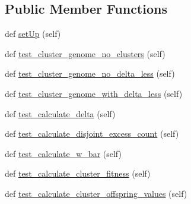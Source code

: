 \subsection*{Public Member Functions}
\begin{DoxyCompactItemize}
\item 
def \hyperlink{classNEAT__PyGenetics_1_1NEAT_1_1Tests_1_1GenomeClustererTests_1_1test__genomeClusterer_1_1TestGenomeClusterer_ad0bdd164ebb6347c8beb4ddf7742fb52}{set\+Up} (self)
\item 
def \hyperlink{classNEAT__PyGenetics_1_1NEAT_1_1Tests_1_1GenomeClustererTests_1_1test__genomeClusterer_1_1TestGenomeClusterer_a66e6a11e2e6d41bc5a8b276560029e96}{test\+\_\+cluster\+\_\+genome\+\_\+no\+\_\+clusters} (self)
\item 
def \hyperlink{classNEAT__PyGenetics_1_1NEAT_1_1Tests_1_1GenomeClustererTests_1_1test__genomeClusterer_1_1TestGenomeClusterer_ab619a0c345abbaf2ff03e990c514d193}{test\+\_\+cluster\+\_\+genome\+\_\+no\+\_\+delta\+\_\+less} (self)
\item 
def \hyperlink{classNEAT__PyGenetics_1_1NEAT_1_1Tests_1_1GenomeClustererTests_1_1test__genomeClusterer_1_1TestGenomeClusterer_a75b6137cf256927638ce38b23d0b8d0d}{test\+\_\+cluster\+\_\+genome\+\_\+with\+\_\+delta\+\_\+less} (self)
\item 
def \hyperlink{classNEAT__PyGenetics_1_1NEAT_1_1Tests_1_1GenomeClustererTests_1_1test__genomeClusterer_1_1TestGenomeClusterer_a677e1ee47c1688bfab9c2c183921aa1c}{test\+\_\+calculate\+\_\+delta} (self)
\item 
def \hyperlink{classNEAT__PyGenetics_1_1NEAT_1_1Tests_1_1GenomeClustererTests_1_1test__genomeClusterer_1_1TestGenomeClusterer_a31a46433f70bd1b7a4b3f480899c612f}{test\+\_\+calculate\+\_\+disjoint\+\_\+excess\+\_\+count} (self)
\item 
def \hyperlink{classNEAT__PyGenetics_1_1NEAT_1_1Tests_1_1GenomeClustererTests_1_1test__genomeClusterer_1_1TestGenomeClusterer_ac3c3bbcc8ab434021544730fdaff33fb}{test\+\_\+calculate\+\_\+w\+\_\+bar} (self)
\item 
def \hyperlink{classNEAT__PyGenetics_1_1NEAT_1_1Tests_1_1GenomeClustererTests_1_1test__genomeClusterer_1_1TestGenomeClusterer_a825bce2fcf584d1947fcfcb555357fb1}{test\+\_\+calculate\+\_\+cluster\+\_\+fitness} (self)
\item 
def \hyperlink{classNEAT__PyGenetics_1_1NEAT_1_1Tests_1_1GenomeClustererTests_1_1test__genomeClusterer_1_1TestGenomeClusterer_a750f3d1f911e2046b2f333c2d8a80f20}{test\+\_\+calculate\+\_\+cluster\+\_\+offspring\+\_\+values} (self)
\end{DoxyCompactItemize}
